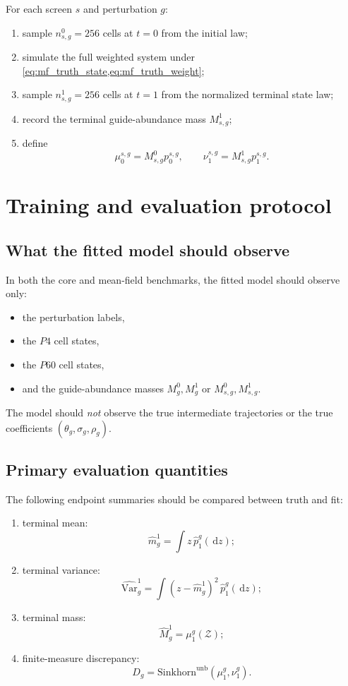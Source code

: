 \documentclass[11pt]{article}
\newcommand{\Var}{\mathrm{Var}}
\newcommand{\dd}{\,\mathrm{d}}
\newcommand{\Zcal}{\mathcal{Z}}
\begin{document}
For each screen \(s\) and perturbation \(g\):
\begin{enumerate}[label=(\arabic*),leftmargin=2.2em]
    \item sample \(n_{s,g}^0=256\) cells at \(t=0\) from the initial law;
    \item simulate the full weighted system under \cref{eq:mf_truth_state,eq:mf_truth_weight};
    \item sample \(n_{s,g}^1=256\) cells at \(t=1\) from the normalized terminal state law;
    \item record the terminal guide-abundance mass \(M_{s,g}^1\);
    \item define
    \[
    \mu_{0}^{s,g}=M_{s,g}^0p_0^{s,g},
    \qquad
    \nu_1^{s,g}=M_{s,g}^1p_1^{s,g}.
    \]
\end{enumerate}

\section{Training and evaluation protocol}

\subsection{What the fitted model should observe}

In both the core and mean-field benchmarks, the fitted model should observe only:
\begin{itemize}[leftmargin=2em]
    \item the perturbation labels,
    \item the $P4$ cell states,
    \item the $P60$ cell states,
    \item and the guide-abundance masses \(M_g^0,M_g^1\) or \(M_{s,g}^0,M_{s,g}^1\).
\end{itemize}

The model should \emph{not} observe the true intermediate trajectories or the true coefficients \((\theta_g,\sigma_g,\rho_g)\).

\subsection{Primary evaluation quantities}

The following endpoint summaries should be compared between truth and fit:
\begin{enumerate}[label=(E\arabic*),leftmargin=2.6em]
    \item terminal mean:
    \[
    \hat m_g^1 = \int z\,\hat p_1^g(\dd z);
    \]
    \item terminal variance:
    \[
    \widehat{\Var}_g^1 = \int (z-\hat m_g^1)^2\,\hat p_1^g(\dd z);
    \]
    \item terminal mass:
    \[
    \hat M_g^1 = \mu_1^g(\Zcal);
    \]
    \item finite-measure discrepancy:
    \[
    D_g = \mathrm{Sinkhorn}^{\mathrm{unb}}(\mu_1^g,\nu_1^g).
    \]
\end{enumerate}
\end{document}
